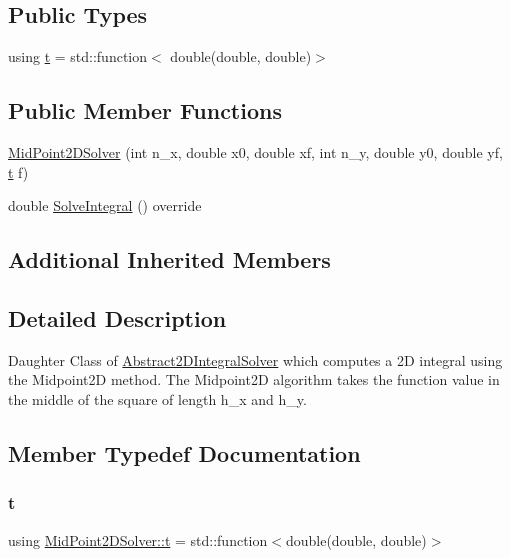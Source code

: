 \subsection*{Public Types}
\begin{DoxyCompactItemize}
\item 
using \hyperlink{class_mid_point2_d_solver_a1f2d1dcde9b60f07f70d3e8581635714}{t} = std\+::function$<$ double(double, double)$>$
\end{DoxyCompactItemize}
\subsection*{Public Member Functions}
\begin{DoxyCompactItemize}
\item 
\hyperlink{class_mid_point2_d_solver_a9cc9f211031ce410a2fe5287db720460}{Mid\+Point2\+D\+Solver} (int n\+\_\+x, double x0, double xf, int n\+\_\+y, double y0, double yf, \hyperlink{class_abstract2_d_integral_solver_ab660df32953c6b0f9f3a45a8720eaeb3}{t} f)
\item 
double \hyperlink{class_mid_point2_d_solver_a45c6c6802b7d40c35f1f60f1a39f5042}{Solve\+Integral} () override
\end{DoxyCompactItemize}
\subsection*{Additional Inherited Members}


\subsection{Detailed Description}
Daughter Class of \hyperlink{class_abstract2_d_integral_solver}{Abstract2\+D\+Integral\+Solver} which computes a 2D integral using the Midpoint2D method. The Midpoint2D algorithm takes the function value in the middle of the square of length h\+\_\+x and h\+\_\+y. 

\subsection{Member Typedef Documentation}
\mbox{\label{class_mid_point2_d_solver_a1f2d1dcde9b60f07f70d3e8581635714}} 
\subsubsection{\texorpdfstring{t}{t}}
{\footnotesize\ttfamily using \hyperlink{class_mid_point2_d_solver_a1f2d1dcde9b60f07f70d3e8581635714}{Mid\+Point2\+D\+Solver\+::t} =  std\+::function$<$double(double, double)$>$}

